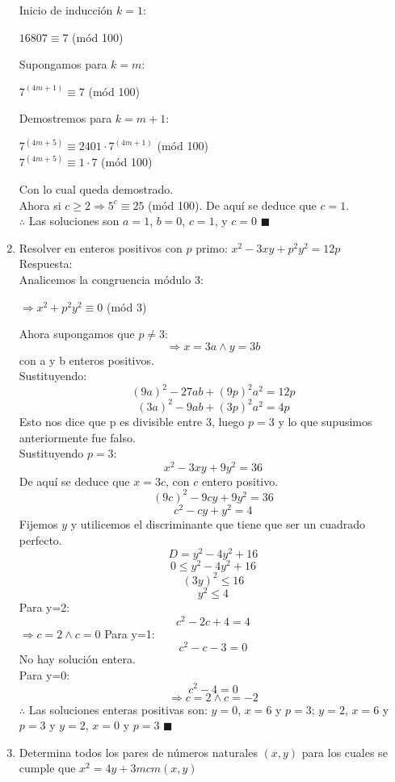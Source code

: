 \documentclass{book}
\begin{document}
\begin{enumerate}
Inicio de inducción $k=1$: 
				\begin{center}
					$16807\equiv 7$ (mód 100)\\
				\end{center}
Supongamos para $k=m$:
				 \begin{center}
				 	$7^{(4m+1)}\equiv 7$ (mód 100)\\
				 \end{center}
Demostremos para $k=m+1$:
				\begin{center}
					$7^{(4m+5)}\equiv 2401\cdot 7^{(4m+1)}$  (mód 100)\\
					$7^{(4m+5)}\equiv 1\cdot 7$ (mód 100)\\
				\end{center}
Con lo cual queda demostrado.\\
Ahora si $c\geq 2\Rightarrow 5^c\equiv 25$ (mód 100). De aquí se deduce que $c=1$.\\
$\therefore$ Las soluciones son $a=1$, $b=0$, $c=1$, y $c=0$ $\blacksquare$\\
			\item Resolver en enteros positivos con $p$ primo: $x^2-3xy+p^2y^2=12p$ \\
			Respuesta:\\
			Analicemos la congruencia módulo 3:
				\begin{center}
					$\Rightarrow x^2+p^2 y^2\equiv 0$ (mód 3)
				\end{center}
Ahora supongamos que $p\neq3$:
$$\Rightarrow x=3a \wedge y=3b$$
con a y b enteros positivos. \\
Sustituyendo:
$${(9a)}^2-27ab+{(9p)}^2 a^2=12p$$
$${(3a)}^2-9ab+{(3p)}^2 a^2=4p$$
Esto nos dice que p es divisible entre 3, luego $p=3$ y lo que supusimos anteriormente fue falso.\\
Sustituyendo $p=3$:
$$x^2-3xy+9y^2=36$$
De aquí se deduce que $x=3c$, con $c$ entero positivo.
$${(9c)}^2-9cy+9y^2=36$$
$$c^2-cy+y^2=4$$
Fijemos $y$ y utilicemos el discriminante que tiene que ser un cuadrado perfecto.
$$D=y^2-4y^2+16$$
$$0\leq y^2-4y^2+16$$
$${(3y)}^2\leq 16$$
$$y^2\leq 4$$
Para y=2:
$$c^2-2c+4=4$$
$\Rightarrow c=2 \wedge c=0$
Para y=1:
$$c^2-c-3=0$$
No hay solución entera.\\
Para y=0:
$$c^2-4=0$$
$$\Rightarrow c=2 \wedge c=-2$$
$\therefore$ Las soluciones enteras positivas son: $y=0$, $x=6$ y $p=3$; $y=2$, $x=6$ y $p=3$ y $y=2$, $x=0$ y $p=3$ $\blacksquare$\\
			\item Determina todos los pares de números naturales $(x,y)$ para los cuales se cumple que $x^2=4y+3mcm(x,y)$\\

\end{enumerate}
\end{document}
